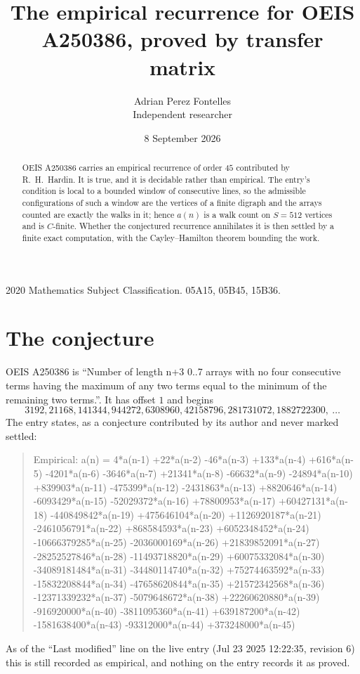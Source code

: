 \documentclass[11pt,a4paper]{article}
\title{The empirical recurrence for OEIS A250386, proved by transfer matrix}
\author{Adrian Perez Fontelles\\ \small Independent researcher}
\date{8 September 2026}
\theoremstyle{plain}
\theoremstyle{definition}
\begin{document}
\maketitle

\begin{abstract}
OEIS A250386 carries an empirical recurrence of order $45$ contributed by R.~H.~Hardin. It is
true, and it is decidable rather than empirical. The entry's condition is local to a bounded window of consecutive lines, so
the admissible configurations of such a window are the vertices of a finite digraph and the
arrays counted are exactly the walks in it; hence $a(n)$ is a walk count on $S=512$ vertices
and is $C$-finite. Whether the conjectured recurrence annihilates it is then settled by a
finite exact computation, with the Cayley--Hamilton theorem bounding the work.
\end{abstract}

\noindent\small 2020 Mathematics Subject Classification. 05A15, 05B45, 15B36.\normalsize

\section{The conjecture}

OEIS A250386 is ``Number of length n+3 0..7 arrays with no four consecutive terms having the maximum of any two terms equal to the minimum of the remaining two terms.''. It has offset $1$ and begins
\[
3192, 21168, 141344, 944272, 6308960, 42158796, 281731072, 1882722300,\ \dots
\]
The entry states, as a conjecture contributed by its author and never marked settled:
\begin{quote}
Empirical: a(n) = 4*a(n-1) +22*a(n-2) -46*a(n-3) +133*a(n-4) +616*a(n-5) -4201*a(n-6) -3646*a(n-7) +21341*a(n-8) -66632*a(n-9) -24894*a(n-10) +839903*a(n-11) -475399*a(n-12) -2431863*a(n-13) +8820646*a(n-14) -6093429*a(n-15) -52029372*a(n-16) +78800953*a(n-17) +60427131*a(n-18) -440849842*a(n-19) +475646104*a(n-20) +1126920187*a(n-21) -2461056791*a(n-22) +868584593*a(n-23) +6052348452*a(n-24) -10666379285*a(n-25) -2036000169*a(n-26) +21839852091*a(n-27) -28252527846*a(n-28) -11493718820*a(n-29) +60075332084*a(n-30) -34089181484*a(n-31) -34480114740*a(n-32) +75274463592*a(n-33) -15832208844*a(n-34) -47658620844*a(n-35) +21572342568*a(n-36) -12371339232*a(n-37) -5079648672*a(n-38) +22260620880*a(n-39) -916920000*a(n-40) -3811095360*a(n-41) +639187200*a(n-42) -1581638400*a(n-43) -93312000*a(n-44) +373248000*a(n-45)
\end{quote}
As of the ``Last modified'' line on the live entry (Jul 23 2025 12:22:35, revision 6) this is still
recorded as empirical, and nothing on the entry records it as proved.
\end{document}
